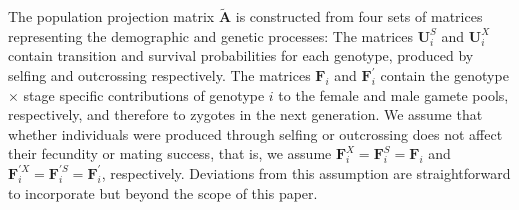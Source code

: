 \documentclass[11pt]{article}
\def\mbf#1{\mathbf{#1}}
\begin{document}
The population projection matrix $\tilde{\mbf{A}}$ is constructed from four sets of matrices representing the demographic and genetic processes: The matrices $\mbf{U}^{S}_{i}$ and $\mbf{U}^{X}_{i}$ contain transition and survival probabilities for each genotype, produced by selfing and outcrossing respectively. The matrices $\mbf{F}_{i}$ and $\mbf{F}^{\prime}_{i}$ contain the genotype $\times$ stage specific contributions of genotype $i$ to the female and male gamete pools, respectively, and therefore to zygotes in the next generation. We assume that whether individuals were produced through selfing or outcrossing does not affect their fecundity or mating success, that is, we assume  $\mbf{F}^X_{i}=\mbf{F}^S_{i}=\mbf{F}_{i}$ and $\mbf{F}^{\prime X}_{i}=\mbf{F}^{\prime S}_{i}=\mbf{F}^{\prime}_{i}$, respectively. Deviations from this assumption are straightforward to incorporate but beyond the scope of this paper. 
\end{document}
